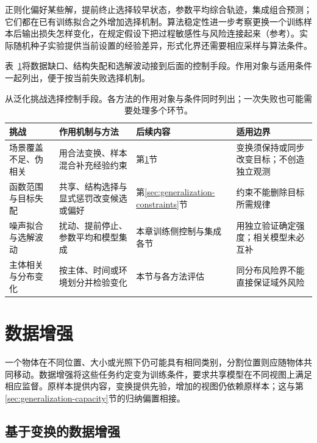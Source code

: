 正则化偏好某些解，提前终止选择较早状态，参数平均综合轨迹，集成组合预测；它们都在已有训练拟合之外增加选择机制。算法稳定性进一步考察更换一个训练样本后输出损失怎样变化，在规定假设下把过程敏感性与风险连接起来（参考）。实际随机种子实验提供当前设置的经验差异，形式化界还需要相应采样与算法条件。

表~\ref{tab:generalization-challenge-remedies}将数据缺口、结构失配和选解波动接到后面的控制手段。作用对象与适用条件一起列出，便于按当前失败选择机制。
\begin{table}[htbp]
\centering\small
\begin{tabular}{@{}p{32mm}p{48mm}p{27mm}p{48mm}@{}}
\toprule
挑战 & 作用机制与方法 & 后续内容 & 适用边界\\
\midrule
场景覆盖不足、伪相关 & 用合法变换、样本混合补充经验约束 & 第\ref{sec:generalization-augmentation}节 & 变换须保持或同步改变目标；不创造独立观测\\
函数范围与目标失配 & 共享、结构选择与显式惩罚改变候选或偏好 & 第\ref{sec:generalization-constraints}节 & 约束不能删除目标所需规律\\
噪声拟合与选解波动 & 扰动、提前停止、参数平均和模型集成 & 本章训练侧控制与集成各节 & 用独立验证确定强度；相关模型未必互补\\
主体相关与分布变化 & 按主体、时间或环境划分并检验变化 & 本节与各方法评估 & 同分布风险界不能直接保证域外风险\\
\bottomrule
\end{tabular}
\caption{从泛化挑战选择控制手段。各方法的作用对象与条件同时列出；一次失败也可能需要处理多个环节。}
\label{tab:generalization-challenge-remedies}
\end{table}

\section{数据增强}
\label{sec:generalization-augmentation}

一个物体在不同位置、大小或光照下仍可能具有相同类别，分割位置则应随物体共同移动。数据增强将这些任务约定变为训练条件，要求共享模型在不同视图上满足相应监督。原样本提供内容，变换提供先验，增加的视图仍依赖原样本；这与第\ref{sec:generalization-capacity}节的归纳偏置相接。

\subsection{基于变换的数据增强}
\label{sec:generalization-transform-augmentation}


